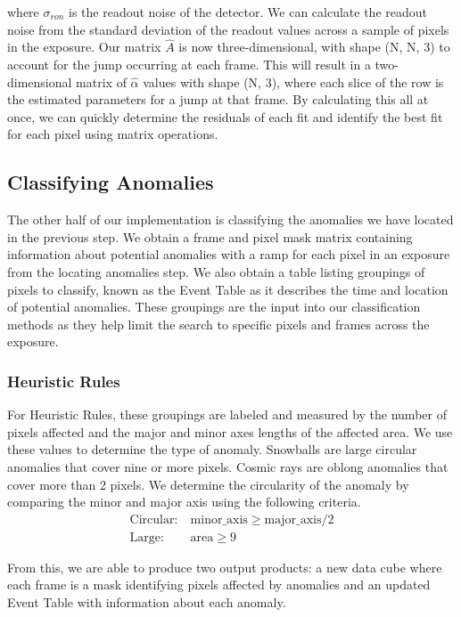 where $\sigma_{ron}$ is the readout noise of the detector.
We can calculate the readout noise from the standard deviation of the readout values across a sample of pixels in the exposure.
Our matrix $\hat{A}$ is now three-dimensional, with shape (N, N, 3) to account for the jump occurring at each frame.
This will result in a two-dimensional matrix of $\hat{\alpha}$ values with shape (N, 3), where each slice of the row is the estimated parameters for a jump at that frame.
By calculating this all at once, we can quickly determine the residuals of each fit and identify the best fit for each pixel using matrix operations.

\subsection{Classifying Anomalies}
The other half of our implementation is classifying the anomalies we have located in the previous step.
We obtain a frame and pixel mask matrix containing information about potential anomalies with a ramp for each pixel in an exposure from the locating anomalies step.
We also obtain a table listing groupings of pixels to classify, known as the Event Table as it describes the time and location of potential anomalies. 
These groupings are the input into our classification methods as they help limit the search to specific pixels and frames across the exposure. 

\subsubsection{Heuristic Rules}
For Heuristic Rules, these groupings are labeled and measured by the number of pixels affected and the major and minor axes lengths of the affected area. 
We use these values to determine the type of anomaly.
Snowballs are large circular anomalies that cover nine or more pixels.
Cosmic rays are oblong anomalies that cover more than 2 pixels. 
We determine the circularity of the anomaly by comparing the minor and major axis using the following criteria.
\begin{align*}
    \text{Circular:}\ &  \text{minor\_axis} \geq \text{major\_axis}/2 \\
    \text{Large:}\ & \text{area} \geq 9
\end{align*}

From this, we are able to produce two output products: a new data cube where each frame is a mask identifying pixels affected by anomalies and an updated Event Table with information about each anomaly. 

